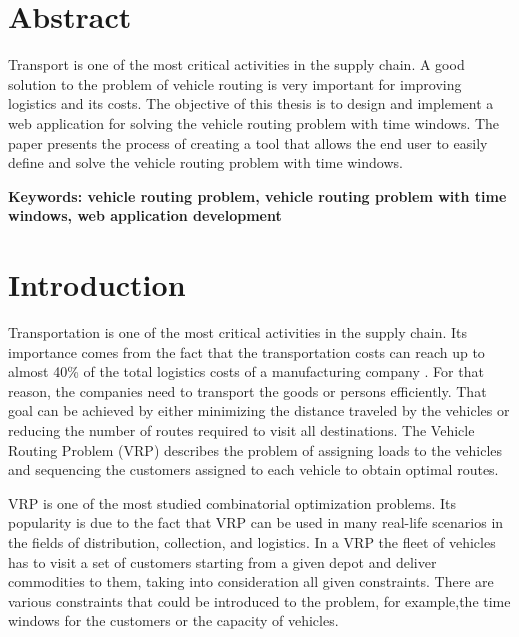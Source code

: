 \documentclass[a4paper,twoside,12pt]{book}
\newcounter{PagesWithoutNumbers}
\begin{document}
\pagestyle{onlyPageNumbers}
\tableofcontents

\setcounter{PagesWithoutNumbers}{\value{page}}
\mainmatter
\pagestyle{empty}

\chapter*{Abstract}

Transport is one of the most critical activities in the supply chain.  A good solution to the problem of vehicle routing is very important for improving logistics and its costs. The objective of this thesis is to design and implement a web application for solving the vehicle routing problem with time windows. The paper presents the process of creating a tool that allows the end user to easily define and solve the vehicle routing problem with time windows.

\bf{Keywords:} vehicle routing problem, vehicle routing problem with time windows, web application development


\cleardoublepage


\pagestyle{PageNumbersChapterTitles}


\normalfont
\chapter{Introduction}

 Transportation is one of the most critical activities in the supply chain. Its importance comes from the fact that the transportation costs can reach up to almost 40\% of the total logistics costs of a manufacturing company \cite{bib:article:sukiennik}. For that reason, the companies need to transport the goods or persons efficiently. That goal can be achieved by either minimizing the distance traveled by the vehicles or reducing the number of routes required to visit all destinations. The Vehicle Routing Problem (VRP) describes the problem of assigning loads to the vehicles and sequencing the customers assigned to each vehicle to obtain optimal routes.

VRP is one of the most studied combinatorial optimization problems. Its popularity is due to the fact that VRP can be used in many real-life scenarios in the fields of distribution, collection, and logistics.
In a VRP the fleet of vehicles has to visit a set of customers starting from a given depot and deliver commodities to them, taking into consideration all given constraints. There are various constraints that could be introduced to the problem, for example,the time windows for the customers or the capacity of vehicles.
\end{document}
